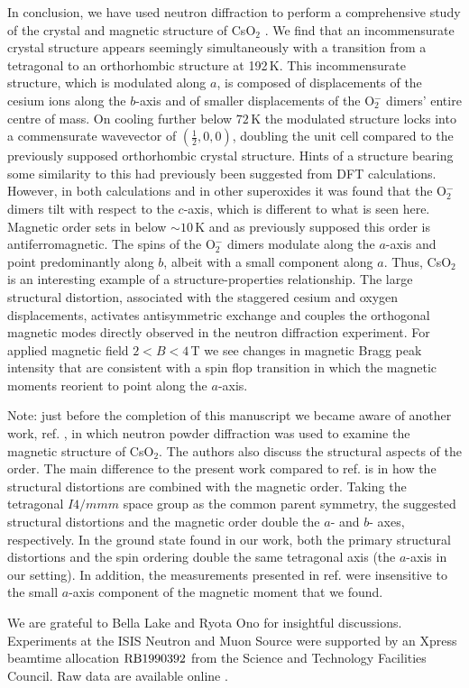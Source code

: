 \documentclass[prb,aps,twocolumn,superscriptaddress,showpacs,footinbib]{revtex4-2}
\newcommand{\cso}{CsO$_{2}$ }
\begin{document}
%
In conclusion, we have used neutron diffraction to perform a comprehensive study of the crystal and magnetic structure of \cso. We find that an incommensurate crystal structure appears seemingly simultaneously with a transition from a tetragonal to an orthorhombic structure at 192\,K. This incommensurate structure, which is modulated along $a$, is composed of displacements of the cesium ions along the $b$-axis and of smaller displacements of the O$_{2}^{-}$ dimers' entire centre of mass. On cooling further below $72$\,K the modulated structure locks into a commensurate wavevector of $(\frac{1}{2},0,0)$, doubling the unit cell compared to the previously supposed orthorhombic crystal structure. Hints of a structure bearing some similarity to this had previously been suggested from DFT calculations. However, in both calculations and in other superoxides it was found that the O$_{2}^{-}$ dimers tilt with respect to the $c$-axis, which is different to what is seen here. Magnetic order sets in below $\sim 10$\,K and as previously supposed this order is antiferromagnetic. The spins of the O$_{2}^{-}$ dimers modulate along the $a$-axis and point predominantly along $b$, albeit with a small component along $a$. Thus, CsO$_2$ is an interesting example of a structure-properties relationship. The large structural distortion, associated with the staggered cesium and oxygen displacements, activates antisymmetric exchange and couples the orthogonal magnetic modes directly observed in the neutron diffraction experiment. For applied magnetic field $2 < B <4$\,T we see changes in magnetic Bragg peak intensity that are consistent with a spin flop transition in which the magnetic moments reorient to point along the $a$-axis.

Note: just before the completion of this manuscript we became aware of another work, ref. , in which neutron powder diffraction was used to examine the magnetic structure of CsO$_{2}$. The authors also discuss the structural aspects of the order. The main difference to the present work compared to ref.  is in how the structural distortions are combined with the magnetic order. Taking the tetragonal $I4/mmm$ space group as the common parent symmetry, the suggested structural distortions and the magnetic order double the $a$- and $b$- axes, respectively. In the ground state found in our work, both the primary structural distortions and the spin ordering double the same tetragonal axis (the $a$-axis in our setting). In addition, the measurements presented in ref.  were insensitive to the small $a$-axis component of the magnetic moment that we found.


\begin{acknowledgements}
We are grateful to Bella Lake and Ryota Ono for insightful discussions. Experiments at the ISIS Neutron and Muon Source were supported by an Xpress beamtime allocation $\rm{RB}1990392$ from the Science and Technology Facilities Council. Raw data are available online \cite{hrpd_data}.
\end{acknowledgements}



\appendix
\end{document}
